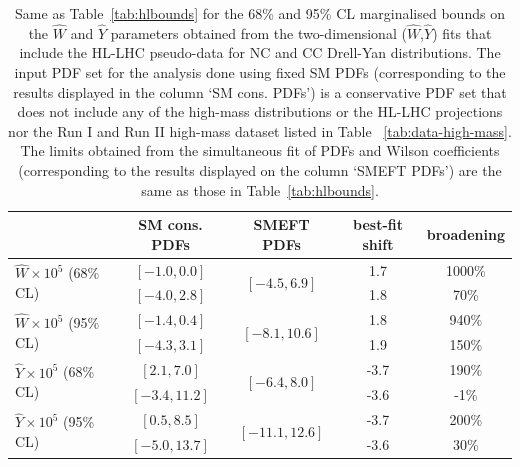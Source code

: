 \documentclass[withindex,glossary]{cam-thesis}
\begin{document}
%
\begin{table}
 \renewcommand{\arraystretch}{1.40}
  \centering
  \begin{tabular}{l|c|c|c|c}
    & SM cons. PDFs & SMEFT PDFs  & best-fit shift  & broadening  \\
    \hline
    \multirow{2}{*}{ $\hat{W}\times 10^5$ (68\% CL)} & $[-1.0, 0.0]$ & \multirow{2}{*}{$[-4.5, 6.9]$}  & 1.7 & 1000\% \\
                                                                        & $[-4.0, 2.8]$ &  & 1.8  & 70\% \\
    \midrule
    \multirow{2}{*}{$\hat{W}\times 10^5$ (95\% CL)} & $[-1.4, 0.4]$ & \multirow{2}{*}{$[-8.1, 10.6]$} & 1.8 & 940\%\\
    & $[-4.3, 3.1]$ &  &  1.9 & 150\%  \\
    \hline
   \multirow{2}{*}{$\hat{Y}\times 10^5$ (68\% CL)} & $[2.1, 7.0]$ & \multirow{2}{*}{$[-6.4, 8.0]$} & -3.7 & 190\% \\
       & $[-3.4,11.2] $ &  & -3.6  & -1\% \\
   \midrule
   \multirow{2}{*}{$\hat{Y}\times 10^5$ (95\% CL)} & $[0.5, 8.5] $ & \multirow{2}{*}{$[-11.1, 12.6]$} & -3.7 & 200\%\\
   & $[-5.0, 13.7] $ &  & -3.6  & 30\% \\
    \hline
  \end{tabular}
  \caption{ \label{tab:hlboundscons}\small
    Same as Table~\ref{tab:hlbounds} for the 68\% and 95\% CL
    marginalised bounds on the $\hat{W}$ and $\hat{Y}$
    parameters obtained from the two-dimensional ($\hat{W}$,$\hat{Y}$)
    fits that include the HL-LHC pseudo-data for NC and CC
    Drell-Yan distributions. The input PDF set for the analysis done
    using fixed SM PDFs (corresponding to the results displayed in the
    column `SM cons. PDFs') is a conservative PDF set that does not
    include any of the high-mass
    distributions or the HL-LHC projections nor the Run I and
    Run II high-mass dataset listed in Table
    ~\ref{tab:data-high-mass}. The limits obtained from the simultaneous fit
    of PDFs and Wilson coefficients  (corresponding to the results displayed on the
    column `SMEFT PDFs') are the same as those in Table~\ref{tab:hlbounds}. 
}
\end{table}
%
\end{document}
